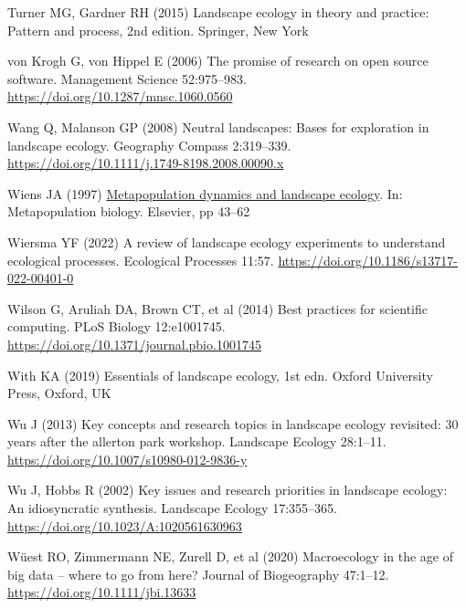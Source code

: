 \documentclass[
  12pt,
  a4paperpaper,
]{article}
\newlength{\cslhangindent}
\newenvironment{CSLReferences}[2] %
 {\begin{list}{}{%
  \setlength{\itemindent}{0pt}
  \setlength{\leftmargin}{0pt}
  \setlength{\parsep}{0pt}
  \ifodd #1
   \setlength{\leftmargin}{\cslhangindent}
   \setlength{\itemindent}{-1\cslhangindent}
  \fi
  \setlength{\itemsep}{#2\baselineskip}}}
 {\end{list}}
\begin{document}
\begin{CSLReferences}{1}{1}
Turner MG, Gardner RH (2015) Landscape ecology in theory and practice:
Pattern and process, 2nd edition. Springer, New York

von Krogh G, von Hippel E (2006) The promise of research on open source
software. Management Science 52:975--983.
\url{https://doi.org/10.1287/mnsc.1060.0560}

Wang Q, Malanson GP (2008) Neutral landscapes: Bases for exploration in
landscape ecology. Geography Compass 2:319--339.
\url{https://doi.org/10.1111/j.1749-8198.2008.00090.x}

Wiens JA (1997)
\href{https://doi.org/10.1016/B978-012323445-2/50005-5}{Metapopulation
dynamics and landscape ecology}. In: Metapopulation biology. Elsevier,
pp 43--62

Wiersma YF (2022) A review of landscape ecology experiments to
understand ecological processes. Ecological Processes 11:57.
\url{https://doi.org/10.1186/s13717-022-00401-0}

Wilson G, Aruliah DA, Brown CT, et al (2014) Best practices for
scientific computing. PLoS Biology 12:e1001745.
\url{https://doi.org/10.1371/journal.pbio.1001745}

With KA (2019) Essentials of landscape ecology, 1st edn. Oxford
University Press, Oxford, UK

Wu J (2013) Key concepts and research topics in landscape ecology
revisited: 30 years after the allerton park workshop. Landscape Ecology
28:1--11. \url{https://doi.org/10.1007/s10980-012-9836-y}

Wu J, Hobbs R (2002) Key issues and research priorities in landscape
ecology: An idiosyncratic synthesis. Landscape Ecology 17:355--365.
\url{https://doi.org/10.1023/A:1020561630963}

Wüest RO, Zimmermann NE, Zurell D, et al (2020) Macroecology in the age
of big data -- where to go from here? Journal of Biogeography 47:1--12.
\url{https://doi.org/10.1111/jbi.13633}

\end{CSLReferences}
\end{document}
